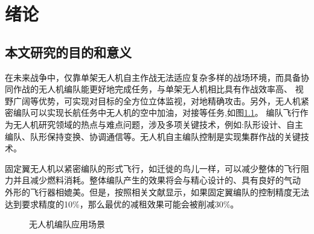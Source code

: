 \chapter{绪论}
\label{chap:intro}
\section{本文研究的目的和意义}
在未来战争中，仅靠单架无人机自主作战无法适应复杂多样的战场环境，而具备协同作战的无人机编队能更好地完成任务，与单架无人机相比具有作战效率高、
视野广阔等优势，可实现对目标的全方位立体监视，对地精确攻击。另外，无人机紧密编队可以实现长航任务中无人机的空中加油，对接等任务,如图\ref{fig:c01-meaning}。
编队飞行作为无人机研究领域的热点与难点问题，涉及多项关键技术，例如:队形设计、自主编队、队形保持变换、协调通信等。无人机自主编队控制是实现集群作战的关键技
术。

固定翼无人机以紧密编队的形式飞行，如迁徙的鸟儿一样，可以减少整体的飞行阻力并且减少燃料消耗。整体编队产生的效果将会与精心设计的、具有良好的气动
外形的飞行器相媲美。但是，按照相关文献显示，如果固定翼编队的控制精度无法达到要求精度的10\%，那么最优的减租效果可能会被削减30\%。
 \begin{figure}[H]
  \centering
  \caption{无人机编队应用场景}
  \label{fig:c01-meaning}
  \end{figure}
